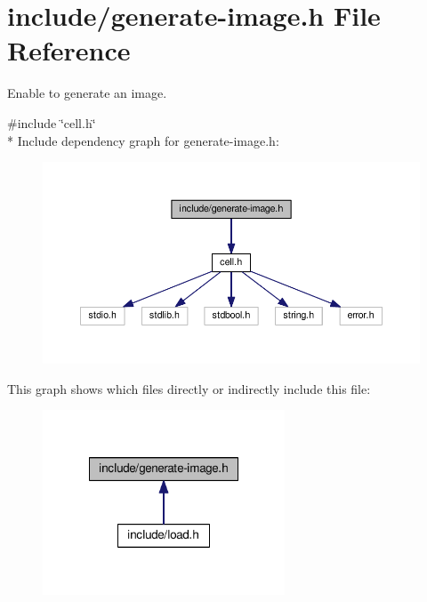 \hypertarget{generate-image_8h}{\section{include/generate-\/image.h File Reference}
\label{generate-image_8h}
}


Enable to generate an image.  


{\ttfamily \#include \char`\"{}cell.\-h\char`\"{}}\\*
Include dependency graph for generate-\/image.h\-:\nopagebreak
\begin{figure}[H]
\begin{center}
\leavevmode
\includegraphics[width=350pt]{generate-image_8h__incl}
\end{center}
\end{figure}
This graph shows which files directly or indirectly include this file\-:\nopagebreak
\begin{figure}[H]
\begin{center}
\leavevmode
\includegraphics[width=204pt]{generate-image_8h__dep__incl}
\end{center}
\end{figure}
